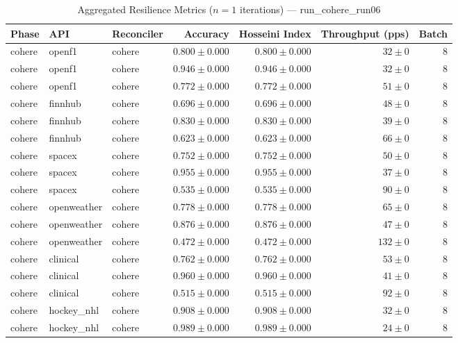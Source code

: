 
\begin{table}[htbp]
\caption{Aggregated Resilience Metrics ($n=1$ iterations) --- run_cohere_run06}
\begin{tabular}{l l l r r r r}
\hline
Phase & API & Reconciler & Accuracy & Hosseini Index & Throughput (pps) & Batch \\
\hline
cohere & openf1 & cohere & $0.800\pm0.000$ & $0.800\pm0.000$ & $32\pm0$ & 8 \\
cohere & openf1 & cohere & $0.946\pm0.000$ & $0.946\pm0.000$ & $32\pm0$ & 8 \\
cohere & openf1 & cohere & $0.772\pm0.000$ & $0.772\pm0.000$ & $51\pm0$ & 8 \\
cohere & finnhub & cohere & $0.696\pm0.000$ & $0.696\pm0.000$ & $48\pm0$ & 8 \\
cohere & finnhub & cohere & $0.830\pm0.000$ & $0.830\pm0.000$ & $39\pm0$ & 8 \\
cohere & finnhub & cohere & $0.623\pm0.000$ & $0.623\pm0.000$ & $66\pm0$ & 8 \\
cohere & spacex & cohere & $0.752\pm0.000$ & $0.752\pm0.000$ & $50\pm0$ & 8 \\
cohere & spacex & cohere & $0.955\pm0.000$ & $0.955\pm0.000$ & $37\pm0$ & 8 \\
cohere & spacex & cohere & $0.535\pm0.000$ & $0.535\pm0.000$ & $90\pm0$ & 8 \\
cohere & openweather & cohere & $0.778\pm0.000$ & $0.778\pm0.000$ & $65\pm0$ & 8 \\
cohere & openweather & cohere & $0.876\pm0.000$ & $0.876\pm0.000$ & $47\pm0$ & 8 \\
cohere & openweather & cohere & $0.472\pm0.000$ & $0.472\pm0.000$ & $132\pm0$ & 8 \\
cohere & clinical & cohere & $0.762\pm0.000$ & $0.762\pm0.000$ & $53\pm0$ & 8 \\
cohere & clinical & cohere & $0.960\pm0.000$ & $0.960\pm0.000$ & $41\pm0$ & 8 \\
cohere & clinical & cohere & $0.515\pm0.000$ & $0.515\pm0.000$ & $92\pm0$ & 8 \\
cohere & hockey\_nhl & cohere & $0.908\pm0.000$ & $0.908\pm0.000$ & $32\pm0$ & 8 \\
cohere & hockey\_nhl & cohere & $0.989\pm0.000$ & $0.989\pm0.000$ & $24\pm0$ & 8 \\

\end{tabular}
\end{table}
